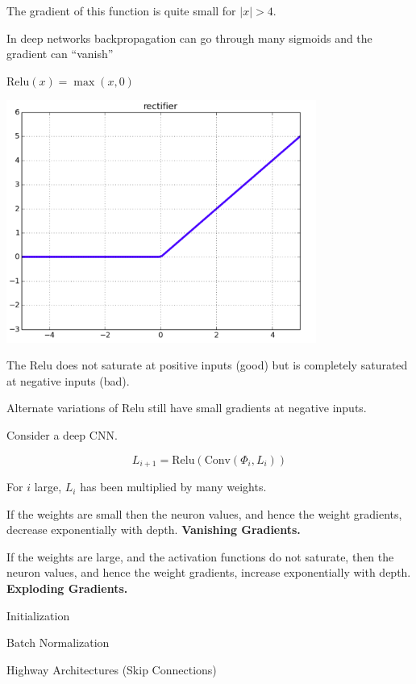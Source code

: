 {\vfill
The gradient of this function is quite small for $|x| > 4$.

\vfill
In deep networks backpropagation can go through many sigmoids and
the gradient can ``vanish''


$\mathrm{Relu}(x) = \max(x,0)$

\vfill
\centerline{\includegraphics[width= 4.0in]{../images/relu}}

\vfill
The Relu does not saturate at positive inputs (good) but is completely saturated at negative inputs (bad).

\vfill
Alternate variations of Relu still have small gradients at negative inputs.


Consider a deep CNN.

$$L_{i+1} = \mathrm{Relu}(\mathrm{Conv}(\Phi_i,L_i))$$

\vfill
For $i$ large, $L_i$ has been multiplied by many weights.

\vfill
If the weights are small then the neuron values, and hence the weight gradients, decrease exponentially with depth. {\bf Vanishing Gradients.}

\vfill
If the weights are large, and the activation functions do not saturate, then the neuron values, and hence the weight gradients,
increase exponentially with depth. {\bf Exploding Gradients.}


\centerline{Initialization}

\vfill
\centerline{Batch Normalization}

\vfill
\centerline{Highway Architectures (Skip Connections)}

}
